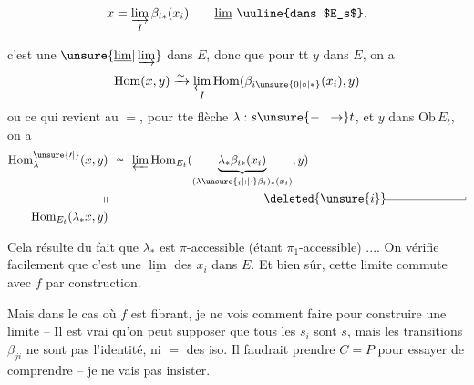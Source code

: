\[ x=\varinjlim_I\beta_{i*}(x_i)\qquad \underline{\lim}\ \text{\uuline{dans $E_s$}}. \]

  c'est une $\unsure{\underline{\lim}|\varinjlim}$ dans $E$, donc que pour tt $y$ dans $E$, on a
\[ \mathrm{Hom}(x,y)\xrightarrow{\sim}\varprojlim_I\mathrm{Hom}(\beta_{i\unsure{0|\circ|*}}(x_i),y) \]
ou ce qui revient au $=$, pour tte flèche $\lambda:s\unsure{\relbar|\to}t$, et $y$ dans $\mathrm{Ob}\,E_t$, on a
\[ \begin{aligned}
\mathrm{Hom}^{\unsure{\prime|{}}}_\lambda(x,y)&\ \overset{\sim}{\relbar}\ \varprojlim\mathrm{Hom}_{E_t}(\underbrace{\lambda_*\beta_{i*}(x_i)}_{(\lambda\unsure{{}_i|:|\cdot}\beta_i)_*(x_i)},y)\\
\shortparallel &\hspace{13em}\deleted{\unsure{i}}\rule[.45ex]{6.6em}{.35pt}\rule[.45ex]{.35pt}{.5ex}\\
\mathrm{Hom}_{E_t}(\lambda_*x,y)&
\end{aligned} \]

Cela résulte  du fait que $\lambda_*$ est $\pi$-accessible (étant $\pi_1$-accessible) .... On vérifie facilement que c'est une $\underline{\lim}$ des $x_i$ dans $E$. Et bien sûr, cette limite commute avec $f$ par construction.

Mais dans le cas où $f$ est fibrant, je ne vois comment faire pour construire une limite   -- Il est vrai qu'on peut  supposer que tous les $s_i$ sont $s$, mais les transitions $\beta_{ji}$ ne sont pas l'identité, ni $=$ des iso. Il faudrait prendre $C=P$ pour essayer de comprendre -- je ne vais pas insister.


